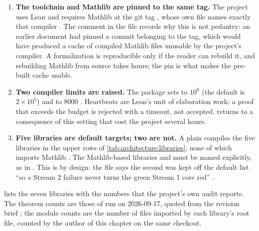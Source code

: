 \begin{enumerate}[leftmargin=*,itemsep=2pt]
\item \textbf{The toolchain and Mathlib are pinned to the same tag.} The project uses Lean
   and requires Mathlib at the git tag , whose own
   file names exactly that compiler . The comment in the file records why this is not pedantry: an earlier
  document had pinned a commit belonging to the  tag, which would have
  produced a cache of compiled Mathlib files unusable by the project's compiler. A
  formalization is reproducible only if the reader can rebuild it, and rebuilding Mathlib
  from source takes hours; the pin is what makes the pre-built cache usable.
\item \textbf{Two compiler limits are raised.} The package sets  to
  $10^6$ (the default is $2\times10^5$) and  to $8000$
  . Heartbeats are Lean's unit of elaboration work; a proof
  that exceeds the budget is rejected with a timeout, not accepted. 
  returns to a consequence of this setting that cost the project several hours.
\item \textbf{Five libraries are default targets; two are not.} A plain 
  compiles the five libraries in the upper rows of \cref{tab:architecture:libraries}, none
  of which imports Mathlib . The Mathlib-based libraries
   and  must be named explicitly,
  as in  . This is by design: the file says the
  second was kept off the default list ``so a Stream 2 failure never turns the green
  Stream 1 core red'' .
\end{enumerate}

 lists the seven libraries with the numbers that the
project's own audit reports. The theorem counts are those of 
run on 2026-09-17, quoted from the revision brief ; the module counts are the number of  files imported by each
library's root file, counted by the author of this chapter on the same checkout.

